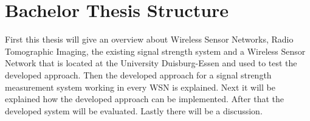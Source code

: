 
\section{Bachelor Thesis Structure}
First this thesis will give an overview about Wireless Sensor Networks, Radio Tomographic Imaging, the existing signal strength system and a Wireless Sensor Network that is located at the University Duisburg-Essen and used to test the developed approach. Then the developed approach for a signal strength measurement system working in every WSN is explained. Next it will be explained how the developed approach can be implemented. After that the developed system will be evaluated. Lastly there will be a discussion.

